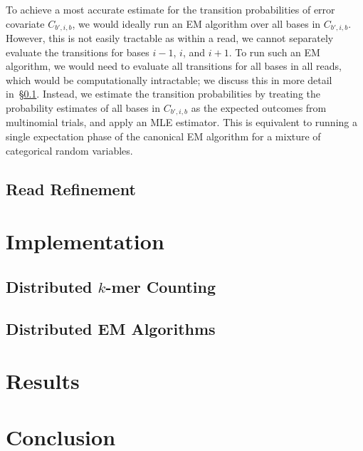 \documentclass{llncs}
\begin{document}
To achieve a most accurate estimate for the transition probabilities of error covariate $C_{b', i, b}$, we
would ideally run an EM algorithm over all bases in $C_{b', i, b}$. However, this is not easily tractable
as within a read, we cannot separately evaluate the transitions for bases $i - 1$, $i$, and $i + 1$. To
run such an EM algorithm, we would need to evaluate all transitions for all bases in all reads, which
would be computationally intractable; we discuss this in more detail in~\S\ref{sec:read-refinement}.
Instead, we estimate the transition probabilities by treating the probability estimates of all bases in
$C_{b', i, b}$ as the expected outcomes from multinomial trials, and apply an MLE estimator. This is
equivalent to running a single expectation phase of the canonical EM algorithm for a mixture of
categorical random variables.

\subsection{Read Refinement}
\label{sec:read-refinement}



\section{Implementation}
\label{sec:implementation}

\subsection{Distributed $k$-mer Counting}
\label{sec:distributed-kmer-counting}

\subsection{Distributed EM Algorithms}
\label{sec:distributed-em}

\section{Results}
\label{sec:results}

\section{Conclusion}
\label{sec:conclusion}



\end{document}
